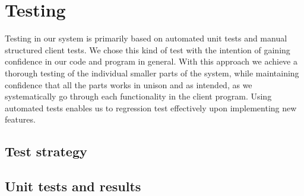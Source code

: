 \section{Testing}
Testing in our system is primarily based on automated unit tests and manual structured client tests. We chose this kind of test with the intention of gaining confidence in our code and program in general. With this approach we achieve a thorough testing of the individual smaller parts of the system, while maintaining confidence that all the parts works in unison and as intended, as we systematically go through each functionality in the client program. Using automated tests enables us to regression test effectively upon implementing new features.

\subsection{Test strategy}


\subsection{Unit tests and results}
